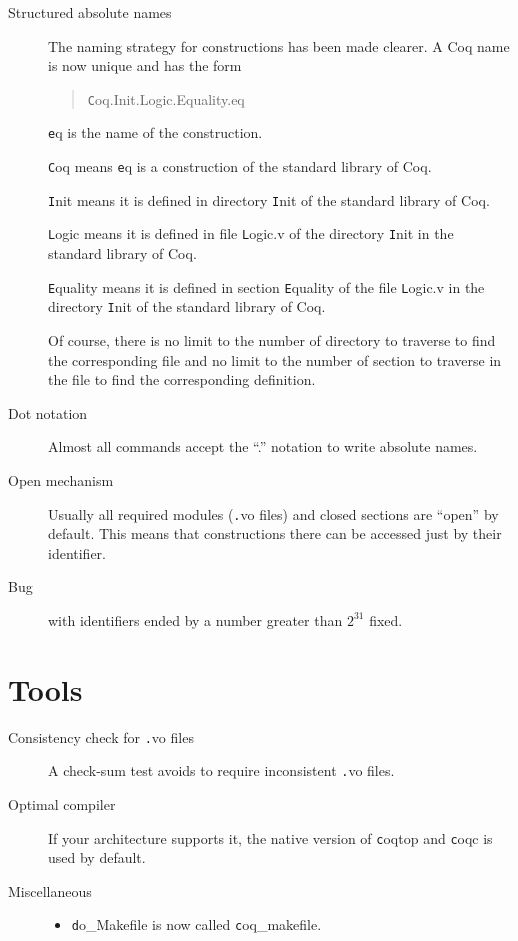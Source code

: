 \documentclass[11pt]{article}
\begin{document}
\begin{description}

\item[Structured absolute names] The naming strategy for constructions
has been made clearer. A Coq name is now unique and has the form

\begin{quote}
{\texttt Coq.Init.Logic.Equality.eq}
\end{quote}

{\texttt eq} is the name of the construction.

{\texttt Coq} means {\texttt eq} is a construction of the standard library of
Coq.

{\texttt Init} means it is defined in directory {\texttt Init} of the
standard library of Coq.

{\texttt Logic} means it is defined in file {\texttt Logic.v} of the
directory {\texttt Init} in the standard library of Coq.

{\texttt Equality} means it is defined in section {\texttt Equality}
of the file {\texttt Logic.v} in the directory {\texttt Init} of the
standard library of Coq.

Of course, there is no limit to the number of directory to traverse to
find the corresponding file and no limit to the number of section to
traverse in the file to find the corresponding definition.

\item[Dot notation] Almost all commands accept the ``.'' notation to
write absolute names.

\item[Open mechanism] Usually all required modules ({\texttt .vo}
files) and closed sections are ``open'' by default. This means that
constructions there can be accessed just by their identifier.


\item[Bug] with identifiers ended by a number greater than $2^{31}$ fixed.

\end{description}

\section{Tools}
\label{Tools}

\begin{description}

\item[Consistency check for {\texttt .vo} files] A check-sum test
avoids to require inconsistent {\texttt .vo} files.

\item[Optimal compiler] If your architecture supports it, the native
version of {\texttt coqtop} and {\texttt coqc} is used by default.

\item[Miscellaneous]

\begin{itemize}
\item {\texttt do\_Makefile} is now called {\texttt coq\_makefile}.

\end{itemize}
\end{description}
\end{document}
